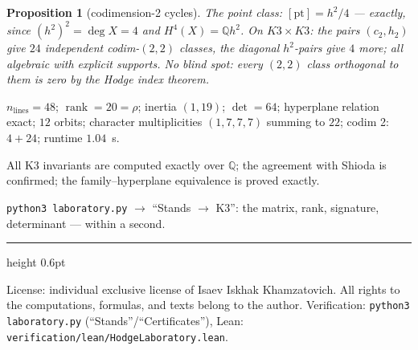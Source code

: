 \documentclass[11pt,a4paper]{article}
\theoremstyle{plain}
\newtheorem{proposition}[theorem]{Proposition}
\theoremstyle{definition}
\theoremstyle{remark}
\newcommand{\QQ}{\mathbb{Q}}
\newcommand{\rank}{\operatorname{rank}}
\begin{document}
\begin{proposition}[codimension-2 cycles]
The point class: $[\mathrm{pt}]=h^2/4$ --- exactly, since
$(h^2)^2=\deg X=4$ and $H^4(X)=\QQ h^2$. On $K3\times K3$: the pairs
$(c_2,h_2)$ give $24$ independent codim-$(2,2)$ classes, the
diagonal $h^2$-pairs give $4$ more; all algebraic with explicit
supports. No blind spot: every $(2,2)$ class orthogonal to them is
zero by the Hodge index theorem.
\end{proposition}

\begin{databox}[numbers]
$n_{\mathrm{lines}}=48$; $\rank=20=\rho$; inertia $(1,19)$;
$\det=64$; hyperplane relation exact; $12$ orbits; character
multiplicities $(1,7,7,7)$ summing to $22$; codim 2: $4+24$;
runtime $1.04$~s.
\end{databox}

\begin{statusbox}[summary]
All K3 invariants are computed exactly over $\QQ$; the agreement
with Shioda is confirmed; the family--hyperplane equivalence is
proved exactly.
\end{statusbox}

\begin{verifybox}[reproduction]
\texttt{python3 laboratory.py} $\to$ ``Stands $\to$ K3'': the
matrix, rank, signature, determinant --- within a second.
\end{verifybox}

\vfill
{\color{linkblue}\hrule height 0.6pt}
\vspace{0.5em}
{\small\color{gray}
License: individual exclusive license of Isaev Iskhak Khamzatovich.
All rights to the computations, formulas, and texts belong to the author.
Verification: \texttt{python3 laboratory.py} (``Stands''/``Certificates''),
Lean: \texttt{verification/lean/HodgeLaboratory.lean}.
}
\end{document}
